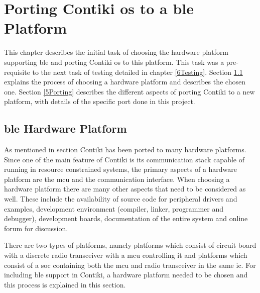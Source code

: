 \chapter{Porting Contiki \texorpdfstring{\gls{os}}{OS} to a \texorpdfstring{\gls{ble}}{BLE} Platform} \label{5bleContiki}

This chapter describes the initial task of choosing the hardware platform supporting \gls{ble} and porting Contiki \gls{os} to this platform. This task was a pre-requisite to the next task of testing detailed in chapter \ref{6Testing}. Section \ref{5HwPlt} explains the process of choosing a hardware platform and describes the chosen one. Section \ref{5Porting} describes the different aspects of porting Contiki to a new platform, with details of the specific port done in this project.

\section{\texorpdfstring{\gls{ble}}{BLE} Hardware Platform} \label{5HwPlt}

As mentioned in section  Contiki has been ported to many hardware platforms. Since one of the main feature of Contiki is its communication stack capable of running in resource constrained systems, the primary aspects of a hardware platform are the \gls{mcu} and the communication interface. When choosing a hardware platform there are many other aspects that need to be considered as well. These include the availability of source code for peripheral drivers and examples, development environment (compiler, linker, programmer and debugger), development boards, documentation of the entire system and online forum for discussion.

There are two types of platforms, namely platforms which consist of circuit board with a discrete radio transceiver with a \gls{mcu} controlling it and platforms which consist of a \gls{soc} containing both the \gls{mcu} and radio transceiver in the same \gls{ic}. For including \gls{ble} support in Contiki, a hardware platform needed to be chosen and this process is explained in this section.

